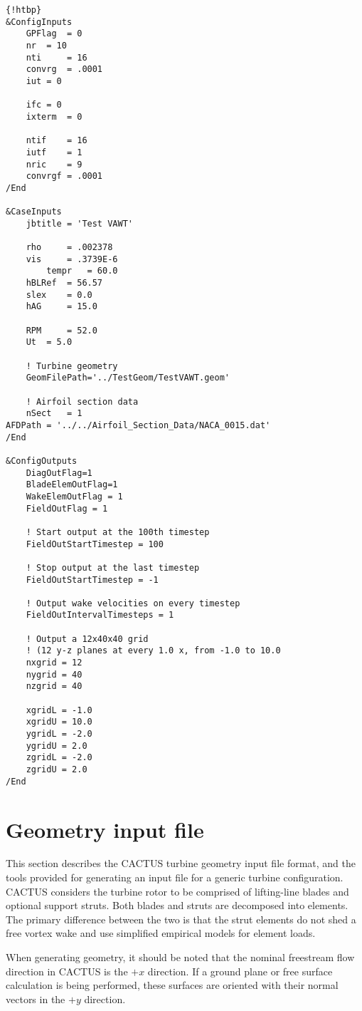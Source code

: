 \begin{lstlisting}{!htbp}
&ConfigInputs
    GPFlag  = 0
    nr  = 10
    nti     = 16
    convrg  = .0001
    iut = 0

    ifc = 0
    ixterm  = 0

    ntif    = 16
    iutf    = 1
    nric    = 9
    convrgf = .0001
/End

&CaseInputs
    jbtitle = 'Test VAWT'

    rho     = .002378
    vis     = .3739E-6
        tempr   = 60.0
    hBLRef  = 56.57
    slex    = 0.0
    hAG     = 15.0

    RPM     = 52.0
    Ut  = 5.0

    ! Turbine geometry
    GeomFilePath='../TestGeom/TestVAWT.geom'

    ! Airfoil section data
    nSect   = 1
AFDPath = '../../Airfoil_Section_Data/NACA_0015.dat'
/End

&ConfigOutputs
    DiagOutFlag=1
    BladeElemOutFlag=1
    WakeElemOutFlag = 1
    FieldOutFlag = 1

    ! Start output at the 100th timestep
    FieldOutStartTimestep = 100

    ! Stop output at the last timestep
    FieldOutStartTimestep = -1

    ! Output wake velocities on every timestep
    FieldOutIntervalTimesteps = 1

    ! Output a 12x40x40 grid
    ! (12 y-z planes at every 1.0 x, from -1.0 to 10.0
    nxgrid = 12
    nygrid = 40
    nzgrid = 40

    xgridL = -1.0
    xgridU = 10.0
    ygridL = -2.0
    ygridU = 2.0
    zgridL = -2.0
    zgridU = 2.0
/End
\end{lstlisting}


\section{Geometry input file}
This section describes the CACTUS turbine geometry input file format, and the tools provided for generating an input file for a generic turbine configuration. CACTUS considers the turbine rotor to be comprised of lifting-line blades and optional support struts. Both blades and struts are decomposed into elements. The primary difference between the two is that the strut elements do not shed a free vortex wake and use simplified empirical models for element loads.

When generating geometry, it should be noted that the nominal freestream flow direction in CACTUS is the $+x$ direction. If a ground plane or free surface calculation is being performed, these surfaces are oriented with their normal vectors in the $+y$ direction.

